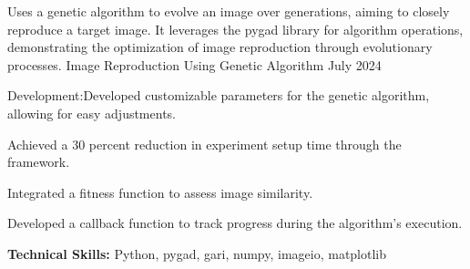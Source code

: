 \begin{cventries}
  \cventry
    {Uses a genetic algorithm to evolve an image over generations, aiming to closely reproduce a target image. It leverages the pygad library for algorithm operations, demonstrating the optimization of image reproduction through evolutionary processes.
} %
    {Image Reproduction Using Genetic Algorithm
} %
    {} %
    {July 2024} %
    {
      \begin{cvitems} %
        \item {Development:Developed customizable parameters for the genetic algorithm, allowing for easy adjustments.}
        \item {Achieved a 30 percent reduction in experiment setup time through the framework.}
        \item {Integrated a fitness function to assess image similarity.
                }
        \item {Developed a callback function to track progress during the algorithm’s execution.}
        \item \textbf{Technical Skills:}{ Python, pygad, gari, numpy, imageio, matplotlib}
      \end{cvitems}
    }
\end{cventries}  
